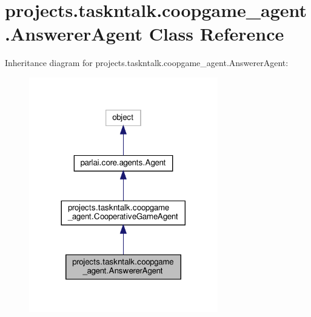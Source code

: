 \hypertarget{classprojects_1_1taskntalk_1_1coopgame__agent_1_1AnswererAgent}{}\section{projects.\+taskntalk.\+coopgame\+\_\+agent.\+Answerer\+Agent Class Reference}
\label{classprojects_1_1taskntalk_1_1coopgame__agent_1_1AnswererAgent}


Inheritance diagram for projects.\+taskntalk.\+coopgame\+\_\+agent.\+Answerer\+Agent\+:\nopagebreak
\begin{figure}[H]
\begin{center}
\leavevmode
\includegraphics[width=233pt]{d1/d93/classprojects_1_1taskntalk_1_1coopgame__agent_1_1AnswererAgent__inherit__graph}
\end{center}
\end{figure}


